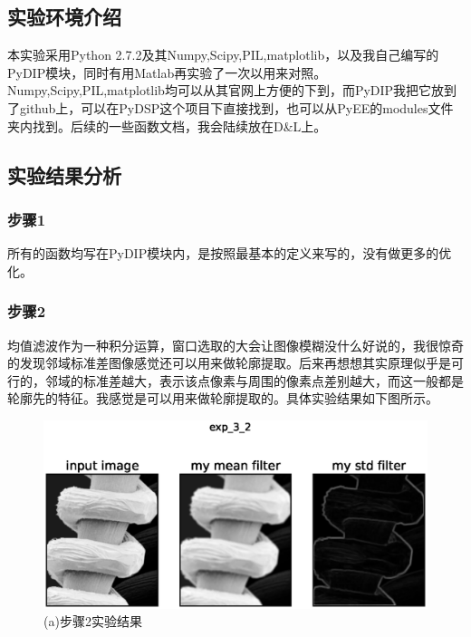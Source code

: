 \documentclass[]{IEEEphot}
\begin{document}
\subsection{实验环境介绍}
本实验采用Python 2.7.2及其Numpy,Scipy,PIL,matplotlib，以及我自己编写的PyDIP模块，同时有用Matlab再实验了一次以用来对照。
Numpy,Scipy,PIL,matplotlib均可以从其官网上方便的下到，而PyDIP我把它放到了github上，可以在PyDSP这个项目下直接找到，也可以从PyEE的modules文件夹内找到。后续的一些函数文档，我会陆续放在D\&L上。
\subsection{实验结果分析}
\subsubsection{步骤1}
所有的函数均写在PyDIP模块内，是按照最基本的定义来写的，没有做更多的优化。
\subsubsection{步骤2}
均值滤波作为一种积分运算，窗口选取的大会让图像模糊没什么好说的，我很惊奇的发现邻域标准差图像感觉还可以用来做轮廓提取。后来再想想其实原理似乎是可行的，邻域的标准差越大，表示该点像素与周围的像素点差别越大，而这一般都是轮廓先的特征。我感觉是可以用来做轮廓提取的。具体实验结果如下图所示。
\begin{figure}[h]
	\centering
	\includegraphics[width=30pc]{exp_3_2.eps}
	\caption{(a)步骤2实验结果}
\end{figure}
\end{document}
